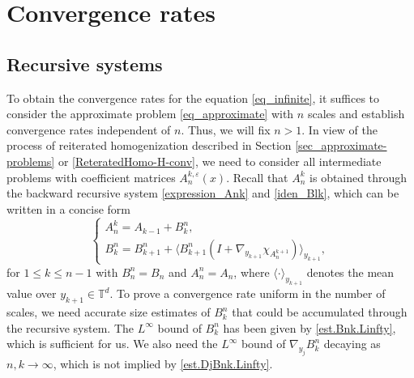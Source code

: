 \documentclass[reqno,12pt]{amsart} %
\theoremstyle{definition}
\theoremstyle{remark}
\numberwithin{equation}{section}
\newcommand{\Ag}[1]{\langle#1\rangle}
\newcommand{\T}{\mathbb{T}}
\newcommand{\e}{\varepsilon}
\begin{document}
\section{Convergence rates}\label{sec_convergence-rates}

\subsection{Recursive systems}\label{sec_recursive-systems}
To obtain the convergence rates for the equation \eqref{eq_infinite}, it suffices to consider the approximate problem \eqref{eq_approximate} with $n$ scales and establish convergence rates independent of $n$. Thus, we will fix $n >1$. 
In view of the process of reiterated homogenization described in Section \ref{sec_approximate-problems}
or \eqref{ReteratedHomo-H-conv}, we need to consider all intermediate problems with coefficient matrices $A_n^{k,\e}(x)$.
Recall that $A^{k}_n$ is obtained through the backward recursive system \eqref{expression_Ank} and \eqref{iden_Blk}, which can be written in a concise form
\begin{equation*}
\begin{cases}
    A_n^k = A_{k-1} + B^n_k,\\
    B^n_k = B^n_{k+1} + \Ag{ B_{k+1}^n (I + \nabla_{y_{k+1}} \chi_{A^{k+1}_n}) }_{y_{k+1}},
\end{cases}
\end{equation*}
for $1\le k \le n-1$ with $B_n^n = B_n$ and $A^n_n = A_n$, where $\Ag{\cdot}_{y_{k+1}}$ denotes the mean value over $y_{k+1} \in \T^d$. To prove a convergence rate uniform in the number of scales, we need accurate size estimates of $B^n_k$ that could be accumulated through the recursive system. The $L^\infty$ bound of $B^n_k$ has been given by \eqref{est.Bnk.Linfty}, which is sufficient for us. We also need the $L^\infty$ bound of $\nabla_{y_j} B^n_k$ decaying as $n, k \to \infty$, which is not implied by \eqref{est.DjBnk.Linfty}.
\end{document}
